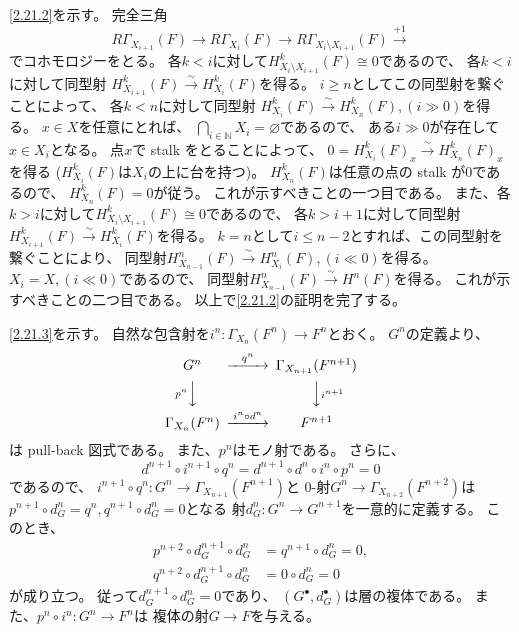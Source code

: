 \documentclass[uplatex,dvipdfmx]{jsarticle}
\makeatletter
\theoremstyle{definition}
\renewenvironment{proof}[1][\proofname]{
  \pushQED{\qed}%
  \normalfont \topsep6\p@\@plus6\p@\relax
  \trivlist
  \item[\hskip\labelsep
    #1\@addpunct{\textbf{.}}]\ignorespaces
}{%
  \popQED\endtrivlist\@endpefalse
}
\providecommand{\proofname}{証明}
\newcommand\N{\mathbb{N}}
\renewcommand{\emptyset}{\varnothing}
\makeatother
\begin{document}
\begin{proof}
  \ref{2.21.2}を示す。
  完全三角
  \[
  R\Gamma_{X_{i+1}}(F) \to R\Gamma_{X_i}(F) \to
  R\Gamma_{X_i\setminus X_{i+1}}(F) \xrightarrow{+1}
  \]
  でコホモロジーをとる。
  各\(k < i\)に対して\(H^k_{X_i\setminus X_{i+1}}(F)\cong 0\)であるので、
  各\(k < i\)に対して同型射
  \(H^k_{X_{i+1}}(F) \xrightarrow{\sim} H^k_{X_i}(F)\)を得る。
  \(i\geq n\)としてこの同型射を繋ぐことによって、
  各\(k < n\)に対して同型射
  \(H^k_{X_i}(F) \xrightarrow{\sim} H^k_{X_n}(F), (i \gg 0)\)を得る。
  \(x\in X\)を任意にとれば、
  \(\bigcap_{i\in \N}X_i = \emptyset\)であるので、
  ある\(i\gg 0\)が存在して\(x\in X_i\)となる。
  点\(x\)で stalk をとることによって、
  \(0 = H^k_{X_i}(F)_x \xrightarrow{\sim} H^k_{X_n}(F)_x\)を得る
  (\(H^k_{X_i}(F)\)は\(X_i\)の上に台を持つ)。
  \(H^k_{X_n}(F)\)は任意の点の stalk が\(0\)であるので、
  \(H^k_{X_n}(F) = 0\)が従う。
  これが示すべきことの一つ目である。
  また、各\(k > i\)に対して\(H^k_{X_i\setminus X_{i+1}}(F)\cong 0\)であるので、
  各\(k > i+1\)に対して同型射
  \(H^k_{X_{i+1}}(F) \xrightarrow{\sim} H^k_{X_i}(F)\)を得る。
  \(k=n\)として\(i\leq n-2\)とすれば、この同型射を繋ぐことにより、
  同型射\(H^n_{X_{n-1}}(F) \xrightarrow{\sim} H^n_{X_i}(F), (i\ll 0)\)を得る。
  \(X_i = X, (i\ll 0)\)であるので、
  同型射\(H^n_{X_{n-1}}(F) \xrightarrow{\sim} H^n(F)\)を得る。
  これが示すべきことの二つ目である。
  以上で\ref{2.21.2}の証明を完了する。

  \ref{2.21.3}を示す。
  自然な包含射を\(i^n:\Gamma_{X_n}(F^n) \to F^n\)とおく。
  \(G^n\)の定義より、
  \[
  \begin{CD}
    G^n @>{q^n}>> \Gamma_{X_{n+1}}(F^{n+1}) \\
    @V{p^n}VV @VV{i^{n+1}}V \\
    \Gamma_{X_n}(F^n) @>{i^n\circ d^n}>> F^{n+1}
  \end{CD}
  \]
  は pull-back 図式である。
  また、\(p^n\)はモノ射である。
  さらに、
  \[
  d^{n+1}\circ i^{n+1}\circ q^n
  = d^{n+1}\circ d^n \circ i^n \circ p^n
  = 0
  \]
  であるので、
  \(i^{n+1}\circ q^n:G^n \to \Gamma_{X_{n+1}}(F^{n+1})\)と
  \(0\)-射\(G^n\to \Gamma_{X_{n+2}}(F^{n+2})\)は
  \(p^{n+1}\circ d_G^n = q^n, q^{n+1}\circ d_G^n=0\)となる
  射\(d_G^n:G^n\to G^{n+1}\)を一意的に定義する。
  このとき、
  \begin{align*}
    p^{n+2}\circ d_G^{n+1}\circ d_G^n
    &= q^{n+1}\circ d_G^n = 0, \\
    q^{n+2}\circ d_G^{n+1}\circ d_G^n
    &= 0\circ d_G^n = 0
  \end{align*}
  が成り立つ。
  従って\(d_G^{n+1}\circ d_G^n = 0\)であり、
  \((G^{\bullet},d_G^{\bullet})\)は層の複体である。
  また、\(p^n\circ i^n : G^n\to F^n\)は
  複体の射\(G\to F\)を与える。


\end{proof}
\end{document}
